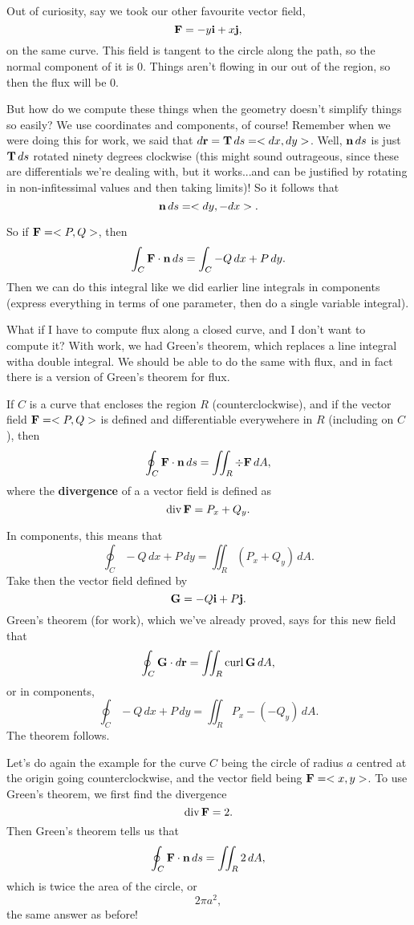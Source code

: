 Out of curiosity, say we took our other favourite vector field, 
\[ \boldsymbol{\mathbf{F}} = -y\boldsymbol{\mathbf{i}} + x\boldsymbol{\mathbf{j}}, \]
on the same curve. This field is tangent to the circle along the path, so the normal component of it is 0. Things aren't flowing in our out of the region, so then the flux will be 0.
\eex 

But how do we compute these things when the geometry doesn't simplify things so easily? We use coordinates and components, of course! Remember when we were doing this for work, we said that $d\boldsymbol{\mathbf{r}} = \boldsymbol{\mathbf{T}}\,ds = <dx,dy>$. Well, $\boldsymbol{\mathbf{n}}\,ds$ is just $\boldsymbol{\mathbf{T}}\,ds$ rotated ninety degrees clockwise (this might sound outrageous, since these are differentials we're dealing with, but it works...and can be justified by rotating in non-infitessimal values and then taking limits)! So it follows that 
\[ \boldsymbol{\mathbf{n}} \,ds = <dy, -dx>. \]

So if $\boldsymbol{\mathbf{F}} = <P,Q>$, then 
\[ \int_C \boldsymbol{\mathbf{F}} \cdot \boldsymbol{\mathbf{n}} \,ds = \int_C -Q\,dx + P\,dy. \]
Then we can do this integral like we did earlier line integrals in components (express everything in terms of one parameter, then do a single variable integral). 

What if I have to compute flux along a closed curve, and I don't want to compute it? With work, we had Green's theorem, which replaces a line integral witha  double integral. We should be able to do the same with flux, and in fact there is a version of Green's theorem for flux.

If $C$ is a curve that encloses the region $R$ (counterclockwise), and if the vector field $\boldsymbol{\mathbf{F}} = <P,Q>$ is defined and differentiable everywehere in $R$ (including on $C$), then
\[ \oint_C \boldsymbol{\mathbf{F}} \cdot \boldsymbol{\mathbf{n}} \, ds = \iint_R \div \boldsymbol{\mathbf{F}}\, dA, \]
where the \textbf{divergence} of a a vector field is defined as
\[ \mathrm{div}\, \boldsymbol{\mathbf{F}} = P_x + Q_y. \]

\bpf
In components, this means that
\[ \oint_C -Q\,dx + P\,dy = \iint_R (P_x+Q_y)\,dA. \]
Take then the vector field defined by 
\[ \boldsymbol{\mathbf{G}} = -Q\boldsymbol{\mathbf{i}} + P\boldsymbol{\mathbf{j}}. \]
Green's theorem (for work), which we've already proved, says for this new field that
\[ \oint_C \boldsymbol{\mathbf{G}} \cdot d\boldsymbol{\mathbf{r}} = \iint_R \mathrm{curl}\, \boldsymbol{\mathbf{G}}\,dA, \]
or in components,
\[ \oint_C -Q\,dx + P\,dy = \iint_R P_x - (-Q_y)\,dA. \]
The theorem follows.
\epf
\etm

\bex
Let's do again the example for the curve $C$ being the circle of radius $a$ centred at the origin going counterclockwise, and the vector field being $\boldsymbol{\mathbf{F}} = <x,y>$. To use Green's theorem, we first find the divergence
\[ \mathrm{div}\, \boldsymbol{\mathbf{F}} = 2. \]
Then Green's theorem tells us that
\[ \oint_C \boldsymbol{\mathbf{F}} \cdot \boldsymbol{\mathbf{n}} \, ds = \iint_R 2\,dA, \]
which is twice the area of the circle, or
\[ 2\pi a^2, \]
the same answer as before!

